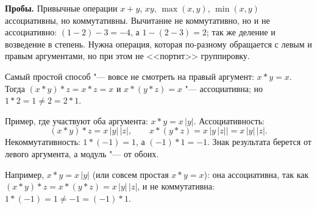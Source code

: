 \begin{solution}[2 (\S\,4)]
\textbf{Пробы.} Привычные операции $x+y$, $xy$, $\max(x,y)$, $\min(x,y)$
ассоциативны, но коммутативны. Вычитание не коммутативно, но и не
ассоциативно: $(1-2)-3=-4$, а $1-(2-3)=2$; так же деление и возведение в
степень. Нужна операция, которая по-разному обращается с левым и правым
аргументами, но при этом не <<портит>> группировку.

Самый простой способ "--- вовсе не смотреть на правый аргумент:
$x*y=x$. Тогда $(x*y)*z=x*z=x$ и $x*(y*z)=x$ "--- ассоциативна; но
$1*2=1\ne2=2*1$.

Пример, где участвуют оба аргумента: $x*y=x\,|y|$. Ассоциативность:
\[
(x*y)*z=x\,|y|\,|z|,\qquad x*(y*z)=x\,\bigl|y\,|z|\bigr|=x\,|y|\,|z| .
\]
Некоммутативность: $1*(-1)=1$, а $(-1)*1=-1$. Знак результата берется от
левого аргумента, а модуль "--- от обоих.

\answer Например, $x*y=x\,|y|$ (или совсем простая $x*y=x$): она
ассоциативна, так как $(x*y)*z=x*(y*z)=x\,|y|\,|z|$, и не коммутативна:
$1*(-1)=1\ne-1=(-1)*1$.
\end{solution}

